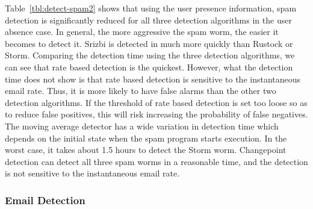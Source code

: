 Table~\ref{tbl:detect-spam2} shows that using the user presence information, spam detection is significantly reduced for all three detection algorithms in the user absence case. 
In general, the more aggressive the spam worm, the easier it 
becomes to detect it. 
Srizbi is detected in much more quickly than Rustock or Storm. Comparing the detection time using the three detection algorithms, we can see that rate based detection is the quickest. 
However, what the detection time does not show is that rate based detection is 
sensitive to the instantaneous email rate.
Thus, it is more likely to have false alarms than the other two detection algorithms. 
If the threshold of rate based detection is set too loose so
as to reduce false positives, this will risk increasing
the probability of false negatives. 
The moving average detector has a wide variation in detection time which
depends on the initial state when the spam program starts execution. In the worst case, it takes about 1.5 hours to detect the Storm worm. 
Changepoint detection can detect all three spam worms in a reasonable time, 
and the detection is not sensitive to the instantaneous email rate. 

\subsubsection{Email Detection}

\begin{table}[bt]
\centering
\noindent{}
\caption{Rules for email detection}
\label{tbl:detect-email}
\end{table}

